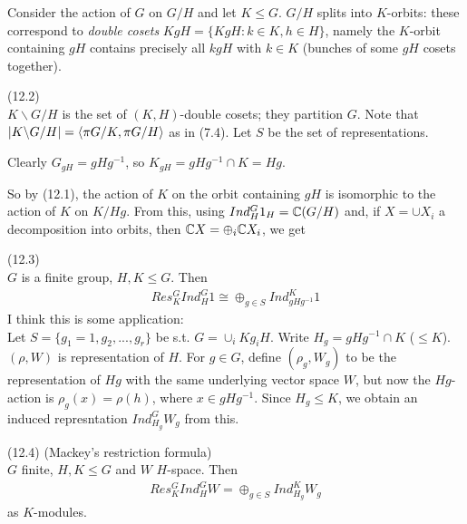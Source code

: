 \documentclass[a4paper]{article}
\begin{document}
Consider the action of $G$ on $G/H$ and let $K \leq G$. $G/H$ splits into $K$-orbits: these correspond to \emph{double cosets} $KgH = \{KgH : k \in K, h \in H\}$, namely the $K$-orbit containing $gH$ contains precisely all $kgH$ with $k \in K$ (bunches of some $gH$ cosets together).

\begin{notation} (12.2)\\
$K\backslash G/H$ is the set of $(K,H)$-double cosets; they partition $G$. Note that $|K\backslash G/H| = \langle \pi G/K,\pi G/H\rangle$ as in (7.4). Let $S$ be the set of representations.
\end{notation}

Clearly $G_{gH} = gHg^{-1}$, so $K_{gH} = gHg^{-1} \cap K = Hg$.

So by (12.1), the action of $K$ on the orbit containing $gH$ is isomorphic to the action of $K$ on $K/Hg$. From this, using $Ind_H^G 1_H = \mathbb{C}(G/H)$ and, if $X = \cup X_i$ a decomposition into orbits, then $\mathbb{C} X = \oplus_i \mathbb{C} X_i$, we get

\begin{prop} (12.3)\\
$G$ is a finite group, $H,K \leq G$. Then
\begin{equation*}
\begin{aligned}
Res_K^G Ind_H^G 1 \cong \oplus_{g \in S} Ind_{gHg^{-1}}^K 1
\end{aligned}
\end{equation*}
I think this is some application:\\
Let $S = \{g_1=1,g_2,...,g_r\}$ be s.t. $G = \cup_i Kg_i H$. Write $H_g = gHg^{-1} \cap K$ ($\leq K$). $(\rho,W)$ is representation of $H$. For $g \in G$, define $(\rho_g,W_g)$ to be the representation of $Hg$ with the same underlying vector space $W$, but now the $Hg$-action is $\rho_g(x) = \rho(h)$, where $x \in gHg^{-1}$. Since $H_g \leq K$, we obtain an induced represntation $Ind_{H_g}^G W_g$ from this.
\end{prop}

\begin{thm} (12.4) (Mackey's restriction formula)\\
$G$ finite, $H,K \leq G$ and $W$ $H$-space. Then
\begin{equation*}
\begin{aligned}
Res_K^G Ind_H^G W = \oplus_{g\in S} Ind_{H_g}^K W_g
\end{aligned}
\end{equation*}
as $K$-modules.
\end{thm}
\end{document}
